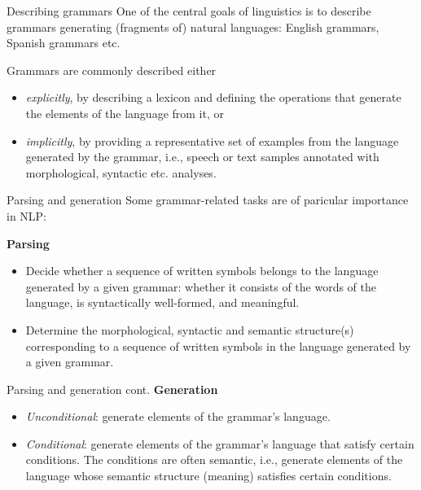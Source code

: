 \documentclass[style=upen, size=14pt]{powerdot}
\newcommand{\gold}{\color{arany}}
\begin{document}
\begin{slide}[toc=]{Describing grammars}
  One of the central goals of linguistics is to describe grammars generating
  (fragments of) natural languages: English grammars, Spanish grammars etc.\bigskip
  
  Grammars are commonly described either
  \begin{itemize}
  \item \emph{explicitly}, by describing a lexicon and defining the operations
    that generate the elements of the language from it, or
  \item \emph{implicitly}, by providing a representative set of examples from
   the language generated by the grammar, i.e., speech or text samples
    annotated with morphological, syntactic etc. analyses.
  \end{itemize}
\end{slide}

\begin{slide}{Parsing and generation}
  Some grammar-related tasks are of paricular importance in NLP:\bigskip

  \textbf{{\gold Parsing}}
  
  \begin{itemize}
  \item Decide whether a sequence of written symbols belongs to the language
    generated by a given grammar: whether it consists of the words of the
    language, is syntactically well-formed, and meaningful.
    \item Determine the morphological, syntactic and semantic structure(s)
      corresponding to a sequence of written symbols in the language
      generated by a given grammar.
  \end{itemize}
\end{slide}

\begin{slide}[toc=]{Parsing and generation cont.}
  \textbf{{\gold Generation}}\bigskip
  
    \begin{itemize}
    \item \emph{Unconditional}: generate elements of the grammar's language. 
    \item \emph{Conditional}: generate elements of the grammar's language that satisfy
      certain conditions. The conditions are often semantic, i.e., generate
      elements of the language whose semantic structure (meaning) satisfies
      certain conditions.
    \end{itemize}
\end{slide}
\end{document}
